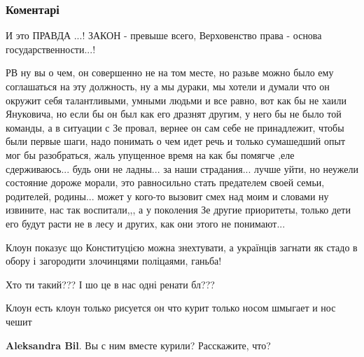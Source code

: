  
 
 
 
 
\subsubsection{Коментарі}
\label{sec:03_12_2021.fb.kuzmin_renat.1.oshybka_prezident.cmt}

\begin{itemize} %

И это ПРАВДА ...! ЗАКОН - превыше всего, Верховенство права - основа
государственности...!



РВ ну вы о чем, он совершенно не на том месте, но разьве можно было ему
соглашаться на эту должность, ну а мы дураки, мы хотели и думали что он окружит
себя талантливыми, умными людьми и все равно, вот как бы не хаили Януковича, но
если бы он был как его дразнят другим, у него бы не было той команды, а в
ситуации с Зе провал, вернее он сам себе не принадлежит, чтобы были первые
шаги, надо понимать о чем идет речь и только сумашедший опыт мог бы
разобраться, жаль упущенное время на как бы помягче ,еле сдерживаюсь... будь они
не ладны... за наши страдания... лучше уйти, но неужели состояние дороже морали,
это равносильно стать предателем своей семьи, родителей, родины... может у
кого-то вызовит смех над моим и словами ну извините, нас так воспитали,,, а у
поколения Зе другие приоритеты, только дети его будут расти не в лесу и других,
как они этого не понимают...


Клоун показує що Конституцією можна знехтувати, а українців загнати як стадо в
обору і загородити злочинцями поліцаями, ганьба!


Хто ти такий??? І шо це в нас одні ренати бл???


Клоун есть клоун только рисуется он что курит только носом шмыгает и нос чешит

\begin{itemize} %
\textbf{Aleksandra Bil}. Вы с ним вместе курили? Расскажите, что?


\end{itemize}
\end{itemize}
